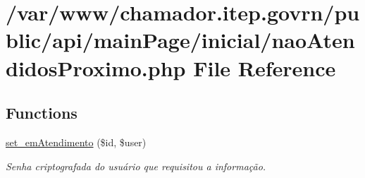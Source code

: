 \hypertarget{nao_atendidos_proximo_8php}{}\section{/var/www/chamador.itep.\+govrn/public/api/main\+Page/inicial/nao\+Atendidos\+Proximo.php File Reference}
\label{nao_atendidos_proximo_8php}
\subsection*{Functions}
\begin{DoxyCompactItemize}
\item 
\hyperlink{nao_atendidos_proximo_8php_aa053116387f6a1dc0020775d61ef19e0}{set\+\_\+em\+Atendimento} (\$id, \$user)
\begin{DoxyCompactList}\small\item\em Senha criptografada do usuário que requisitou a informação. \end{DoxyCompactList}\end{DoxyCompactItemize}
